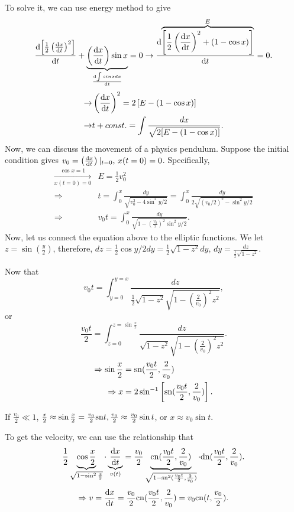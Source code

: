 To solve it, we can use energy method to give
\begin{equation}
\frac{{\mathrm d} {\left[ \frac{1}{2}\left( \frac{{\mathrm d} {x}}{{\mathrm d}t}\right )^2\right]}}{{\mathrm d}t} + \underbrace{\left( \frac{{\mathrm d} {x}}{{\mathrm d}t}\right)\sin{x}}_{\frac{{\mathrm d} {\int sinx dx}}{{\mathrm d}t}}=0
\rightarrow \frac{{\mathrm d} {\overbrace{\left[ \frac{1}{2}\left( \frac{{\mathrm d} {x}}{{\mathrm d}t}\right )^2 + (1-\cos{x})\right]}^{E}}}{{\mathrm d}t}=0.
\end{equation}
\begin{align}
\rightarrow & \left( \frac{{\mathrm d} {x}}{{\mathrm d}t} \right)^2 =2\left[ E-(1-\cos{x})\right]\\
\rightarrow & t + const.=\int \frac{dx}{\sqrt{2[E-(1-\cos{x})]}}.
\end{align}
Now, we can discuss the movement of a physics pendulum. Suppose the initial condition gives $ v_0=\left( \frac{{\mathrm d} {x}}{{\mathrm d}t}\right)|_{t=0},\, x(t=0)=0 $. Specifically, 
\begin{align}
\xrightarrow[x(t=0)=0]{\cos{x}=1} & E=\frac{1}{2}v_0^2\\
\Rightarrow & t=\int_{0}^{x}\frac{dy}{\sqrt{v_0^2-4\sin^2{y/2}}}=\int_{0}^{x}\frac{dy}{2\sqrt{(v_0/2)^2-\sin^2{y/2}}}\\
\Rightarrow & v_0 t =\int_{0}^{x}\frac{dy}{\sqrt{1-\left(\frac{v_0}{2}\right)^2\sin^2{y/2}}}.
\end{align}
Now, let us connect the equation above to the elliptic functions. 
We let $z=\sin(\frac{y}{2})$, therefore, $ dz=\frac{1}{2}\cos{y/2}dy=\frac{1}{2}\sqrt{1-z^2}dy $, $ dy=\frac{dz}{\frac{1}{2}\sqrt{1-z^2}} $.

Now that 
\begin{equation}
v_0 t = \int_{y=0}^{y=x}\frac{dz}{\frac{1}{2}\sqrt{1-z^2}\sqrt{1-\left(\frac{2}{v_0}\right)^2z^2}},
\end{equation}
or
\begin{equation}
\frac{v_0 t}{2} = \int_{z=0}^{z=\sin\frac{x}{2}}\frac{dz}{\sqrt{1-z^2}\sqrt{1-\left(\frac{2}{v_0}\right)^2z^2}}.
\end{equation}
\begin{align}
\Rightarrow \sin{\frac{x}{2}} &= \mathrm{sn}(\frac{v_0 t}{2},\frac{2}{v_0})\\
\Rightarrow x &= 2 \sin^{-1}\left[ \mathrm{sn}(\frac{v_0 t}{2},\frac{2}{v_0})\right].
\end{align}

If $ \frac{v_0}{2} \ll 1 $, $ \frac{x}{2} \approx \sin{\frac{x}{2}}=\frac{v_0}{2} \mathrm{sn}{t,\frac{v_0}{2}} \approx \frac{v_0}{2} \sin t$, or $ x\approx v_0 \sin t $. 

To get the velocity, we can use the relationship that
\begin{equation}
\frac{1}{2} \underbrace{\cos{\frac{x}{2}}}_{\sqrt{1-\sin^2\frac{x}{2}}}\cdot \underbrace{\frac{{\mathrm d} {x}}{{\mathrm d}t}}_{v(t)}= \frac{v_0}{2} \underbrace{\mathrm{cn}(\frac{v_0t}{2},\frac{2}{v_0})}_{\sqrt{1-\mathrm{sn}^2(\frac{v_0t}{2},\frac{2}{v_0})}}\cdot \mathrm{dn}(\frac{v_0 t}{2},\frac{2}{v_0}).
\end{equation}
\begin{equation}
\Rightarrow v=\frac{{\mathrm d} {x}}{{\mathrm d}t}=\frac{v_0}{2} \mathrm{cn}(\frac{v_0 t}{2},\frac{2}{v_0})=v_0 \mathrm{cn}(t,\frac{v_0}{2}).
\end{equation}


